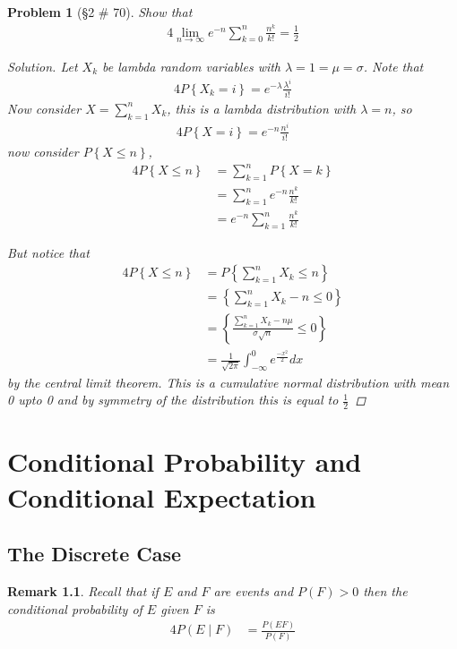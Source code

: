 \documentclass[11pt, oneside]{book}   	%
\newtheorem{remark}{Remark}[chapter]
\newtheorem{problem}{Problem}[chapter]
\newcommand{\set}[1]{\left\{#1\right\}}
\begin{document}
\begin{problem}[\S 2 \# 70]
	Show that 
	\begin{alignat}{4}
		\lim_{n\to\infty}e^{-n}\sum_{k=0}^n\frac{n^k}{k!}=\frac{1}{2}
	\end{alignat}
	\begin{proof}[Solution]
		Let $X_k$ be lambda random variables with $\lambda=1=\mu=\sigma$. Note that 
		\begin{alignat}{4}
			P\set{X_k=i}=e^{-\lambda} \frac{\lambda^i}{i!}
		\end{alignat}
		Now consider $X=\sum_{k=1}^n X_k$, this is a lambda distribution with $\lambda = n$, so 
		\begin{alignat}{4}
			P\set{X=i}=e^{-n}\frac{n^i}{i!}
		\end{alignat}
		now consider $P\set{X\leq n}$,
		\begin{alignat}{4}
			P\set{X\leq n}&=\sum_{k=1}^nP\set{X=k} \\
				&=\sum_{k=1}^ne^{-n}\frac{n^k}{k!} \\
				&=e^{-n}\sum_{k=1}^n\frac{n^k}{k!}
		\end{alignat}
		
		But notice that
		\begin{alignat}{4}
			P\set{X\leq n}&=P\set{\sum_{k=1}^n X_k \leq n} \\
				&=\set{\sum_{k=1}^nX_k -n \leq 0} \\
				&=\set{\frac{\sum_{k=1}^n X_k -n\mu}{\sigma\sqrt{n}}\leq 0} \\
				&=\frac{1}{\sqrt{2\pi}}\int_{-\infty}^0 e^{\frac{-x^2}{2}} dx
		\end{alignat}
		by the central limit theorem. This is a cumulative normal distribution with mean 0 upto 0 and by symmetry of the distribution this is equal to $\frac{1}{2}$
	\end{proof}
\end{problem}

\chapter{Conditional Probability and Conditional Expectation}

\section{The Discrete Case}

\begin{remark}
	Recall that if $E$ and $F$ are events and $P(F)>0$ then the conditional probability of $E$ given $F$ is 
	\begin{alignat}{4}
		P(E\mid F)&=\frac{P(EF)}{P(F)}
	\end{alignat}
\end{remark}


\clearpage
{}
\printindex
\end{document}
